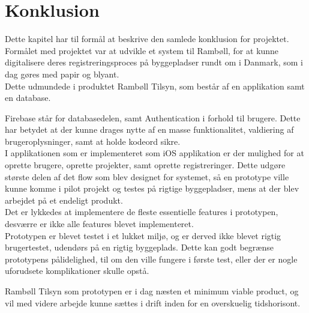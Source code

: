 \chapter{Konklusion}
Dette kapitel har til formål at beskrive den samlede 
konklusion for projektet. \\

Formålet med projektet var at udvikle et system til Rambøll, for at kunne digitalisere deres registreringsproces på byggepladser rundt om i Danmark, som i dag gøres med papir og blyant. \\
Dette udmundede i produktet Rambøll Tilsyn, som består af en applikation samt en database.

Firebase står for databasedelen, samt Authentication i forhold til brugere. Dette har betydet at der kunne drages nytte af en masse funktionalitet, valdiering af brugeroplysninger, samt at holde kodeord sikre. \\
I applikationen som er implementeret som iOS applikation er der mulighed for at oprette brugere, oprette projekter, samt oprette registreringer. Dette udgøre største delen af det flow som blev designet for systemet, så en prototype ville kunne komme i pilot projekt og testes på rigtige byggepladser, mens at der blev arbejdet på et endeligt produkt. \\
Det er lykkedes at implementere de fleste essentielle features i prototypen, desværre er ikke alle features blevet implementeret. \\
Prototypen er blevet testet i et lukket miljø, og er derved ikke blevet rigtig brugertestet, udendørs på en rigtig byggeplads. Dette kan godt begrænse prototypens pålidelighed, til om den ville fungere i første test, eller der er nogle uforudsete komplikationer skulle opstå.

Rambøll Tilsyn som prototypen er i dag næsten et minimum viable product, og vil med videre arbejde
kunne sættes i drift inden for en overskuelig tidshorisont.


